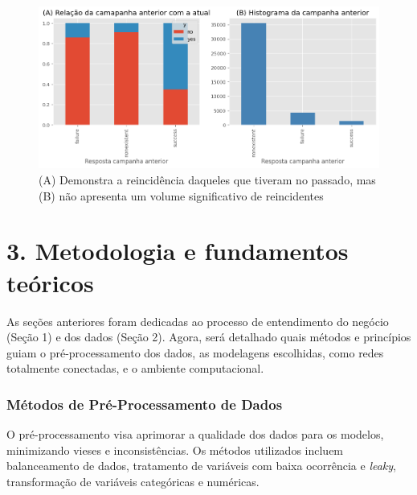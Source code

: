 \documentclass[
  onecolumn]{article}
\begin{document}
\begin{figure}[H]

{\centering \includegraphics[width=1\textwidth,height=\textheight]{hist_pout.png}

}

\caption{(A) Demonstra a reincidência daqueles que tiveram no passado,
mas (B) não apresenta um volume significativo de reincidentes}

\end{figure}%

\section{3. Metodologia e fundamentos
teóricos}\label{metodologia-e-fundamentos-teuxf3ricos}

As seções anteriores foram dedicadas ao processo de entendimento do
negócio (Seção 1) e dos dados (Seção 2). Agora, será detalhado quais
métodos e princípios guiam o pré-processamento dos dados, as modelagens
escolhidas, como redes totalmente conectadas, e o ambiente
computacional.

\subsubsection{Métodos de Pré-Processamento de
Dados}\label{muxe9todos-de-pruxe9-processamento-de-dados}

O pré-processamento visa aprimorar a qualidade dos dados para os
modelos, minimizando vieses e inconsistências. Os métodos utilizados
incluem balanceamento de dados, tratamento de variáveis com baixa
ocorrência e \emph{leaky}, transformação de variáveis categóricas e
numéricas.
\end{document}
